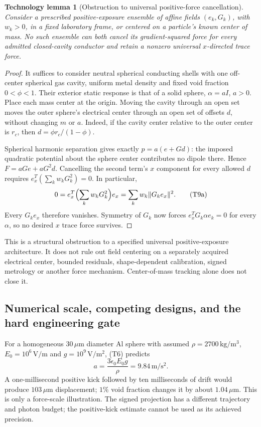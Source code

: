\documentclass[11pt]{article}
\newtheorem{techtheorem}{Technology lemma}
\begin{document}
\begin{techtheorem}[Obstruction to universal positive-force cancellation]\label{thm:positiveforce}
Consider a prescribed positive-exposure ensemble of affine fields $(e_k,G_k)$, with $w_k>0$, in a fixed laboratory frame, or centered on a particle's known center of mass. No such ensemble can both cancel its gradient-squared force for every admitted closed-cavity conductor and retain a nonzero universal $x$-directed trace force.
\end{techtheorem}
\begin{proof}
It suffices to consider neutral spherical conducting shells with one off-center spherical gas cavity, uniform metal density and fixed void fraction $0<\phi<1$. Their exterior static response is that of a solid sphere, $\alpha=aI$, $a>0$. Place each mass center at the origin. Moving the cavity through an open set moves the outer sphere's electrical center through an open set of offsets $d$, without changing $m$ or $a$. Indeed, if the cavity center relative to the outer center is $r_c$, then $d=\phi r_c/(1-\phi)$.

Spherical harmonic separation gives exactly $p=a(e+Gd)$: the imposed quadratic potential about the sphere center contributes no dipole there. Hence $F=aGe+aG^2d$. Cancelling the second term's $x$ component for every allowed $d$ requires $e_x^T(\sum_k w_kG_k^2)=0$. In particular,
\[
 0=e_x^T\Bigl(\sum_k w_kG_k^2\Bigr)e_x
   =\sum_k w_k\lVert G_ke_x\rVert^2.
 \tag{T9a}
\]
Every $G_ke_x$ therefore vanishes. Symmetry of $G_k$ now forces $e_x^TG_k\alpha e_k=0$ for every $\alpha$, so no desired $x$ trace force survives.
\end{proof}

This is a structural obstruction to a specified universal positive-exposure architecture. It does not rule out field centering on a separately acquired electrical center, bounded residuals, shape-dependent calibration, signed metrology or another force mechanism. Center-of-mass tracking alone does not close it.

\subsection{Numerical scale, competing designs, and the hard engineering gate}

For a homogeneous $30\,\mu\mathrm m$ diameter Al sphere with assumed $\rho=2700\,\mathrm{kg/m^3}$, $E_0=10^6\,\mathrm{V/m}$ and $g=10^9\,\mathrm{V/m^2}$, (T6) predicts
\[
 a=\frac{3\epsilon_0E_0g}{\rho}=9.84\,\mathrm{m/s^2}.
\]
A one-millisecond positive kick followed by ten milliseconds of drift would produce $103\,\mu\mathrm m$ displacement; $1\%$ void fraction changes it by about $1.04\,\mu\mathrm m$. This is only a force-scale illustration. The signed projection has a different trajectory and photon budget; the positive-kick estimate cannot be used as its achieved precision.
\end{document}
